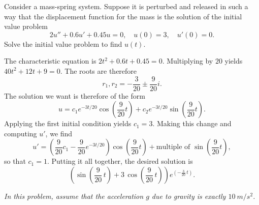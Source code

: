 \documentclass[answers,12pt]{exam}
\begin{document}
\begin{questions}  

\question[20] Consider a mass-spring system. Suppose it is perturbed and released in such a way that the displacement function for the mass is the solution of the initial value problem
\begin{displaymath}
    2u'' + 0.6u' + 0.45 u = 0, \quad u(0) = 3, \quad u'(0) = 0.
\end{displaymath}
Solve the initial value problem to find $u(t)$.
\begin{solution}
    The characteristic equation is $2t^2 + 0.6t + 0.45 = 0$. Multiplying by $20$ yields $40t^2 + 12t + 9 = 0$. The roots are therefore
    \[
        r_1 , r_2 = -\frac{3}{20} \pm \frac{9}{20} i.
    \]
    The solution we want is therefore of the form
    \[
        u = c_1 e^{-3t/20} \cos{\left(\frac{9}{20} t\right)} + c_2 e^{-3t/20} \sin{\left(\frac{9}{20} t\right)}.
    \]
    Applying the first initial condition yields $c_1 = 3$. Making this change and computing $u'$, we find
    \[
        u' = \left(\frac{9}{20}c_1 - \frac{9}{20} e^{-3t/20} \right) \cos{\left(\frac{9}{20} t\right)} + \text{multiple of $\sin{\left(\frac{9}{20} t\right)}$},
    \]
    so that $c_1 = 1$. Putting it all together, the desired solution is
    \[
        \left(\sin\left(\frac{9}{20} \, t\right) + 3 \, \cos\left(\frac{9}{20} \, t\right)\right) e^{\left(-\frac{3}{20} \, t\right)}.
    \]
\end{solution}

\question[20]
\emph{In this problem, assume that the acceleration $g$ due to gravity is exactly $\SI{10}{m/s^2}$.}

\end{questions}
\end{document}

